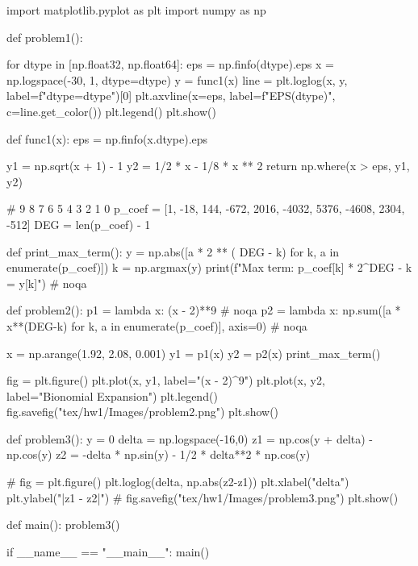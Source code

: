 \documentclass{homework}
\begin{document}
\lstset{language=Python}
\begin{python}
import matplotlib.pyplot as plt
import numpy as np


def problem1():

    for dtype in [np.float32, np.float64]:
        eps = np.finfo(dtype).eps
        x = np.logspace(-30, 1, dtype=dtype)
        y = func1(x)
        line = plt.loglog(x, y, label=f"dtype={dtype}")[0]
        plt.axvline(x=eps, label=f"EPS({dtype})", c=line.get_color())
    plt.legend()
    plt.show()

def func1(x):
    eps = np.finfo(x.dtype).eps

    y1 = np.sqrt(x + 1) - 1
    y2 = 1/2 * x - 1/8 * x ** 2
    return np.where(x > eps, y1, y2)


#         9    8    7     6     5      4     3      2     1     0
p_coef = [1, -18, 144, -672, 2016, -4032, 5376, -4608, 2304, -512]
DEG = len(p_coef) - 1


def print_max_term():
    y = np.abs([a * 2 ** ( DEG - k) for k, a in enumerate(p_coef)])
    k = np.argmax(y)
    print(f"Max term: {p_coef[k]} * 2^{DEG - k} = {y[k]}")  # noqa

def problem2():
    p1 = lambda x: (x - 2)**9  # noqa
    p2 = lambda x:  np.sum([a * x**(DEG-k) for k, a in enumerate(p_coef)], axis=0) # noqa

    x = np.arange(1.92, 2.08, 0.001)
    y1 = p1(x)
    y2 = p2(x)
    print_max_term()

    fig = plt.figure()
    plt.plot(x, y1, label="(x - 2)^9")
    plt.plot(x, y2, label="Bionomial Expansion")
    plt.legend()
    fig.savefig("tex/hw1/Images/problem2.png")
    plt.show()



def problem3():
    y = 0
    delta = np.logspace(-16,0)
    z1 = np.cos(y + delta) - np.cos(y)
    z2 = -delta * np.sin(y) - 1/2 * delta**2 * np.cos(y)

    # fig = plt.figure()
    plt.loglog(delta, np.abs(z2-z1))
    plt.xlabel("delta")
    plt.ylabel("|z1 - z2|")
    # fig.savefig("tex/hw1/Images/problem3.png")
    plt.show()





def main():
    problem3()

if __name__ == "__main__":
    main()



\end{python}
\end{document}
